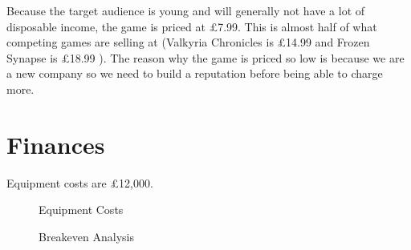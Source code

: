 \documentclass{scrartcl}
\begin{document}
Because the target audience is young and will generally not have a lot of disposable income, the game is priced at \pounds 7.99. This is almost half of what competing games are selling at (Valkyria Chronicles is \pounds 14.99 and Frozen Synapse is \pounds 18.99 \cite{Valkyria, Frozen}). The reason why the game is priced so low is because we are a new company so we need to build a reputation before being able to charge more.


\section{Finances}
Equipment costs are \pounds 12,000.
\begin{figure}[h]
	\caption{Equipment Costs}
\end{figure}


\begin{landscape}
	\begin{figure}[h]
		\caption{Breakeven Analysis}
	\end{figure}
\end{landscape}
\end{document}
